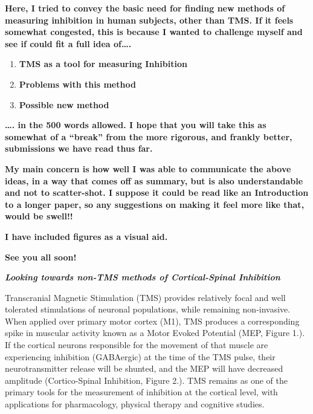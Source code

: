 \documentclass[]{article}
\date{}
\begin{document}
\textbf{Here, I tried to convey the basic need for finding new methods
of measuring inhibition in human subjects, other than TMS. If it feels
somewhat congested, this is because I wanted to challenge myself and see
if could fit a full idea of\ldots{}.}

\begin{enumerate}
\def\labelenumi{\arabic{enumi}.}
\item
  \textbf{TMS as a tool for measuring Inhibition}
\item
  \textbf{Problems with this method}
\item
  \textbf{Possible new method}
\end{enumerate}

\textbf{\ldots{}. in the 500 words allowed. I hope that you will take
this as somewhat of a ``break'' from the more rigorous, and frankly
better, submissions we have read thus far. }

\textbf{My main concern is how well I was able to communicate the above
ideas, in a way that comes off as summary, but is also understandable
and not to scatter-shot. I suppose it could be read like an Introduction
to a longer paper, so any suggestions on making it feel more like that,
would be swell!! }

\textbf{I have included figures as a visual aid. }

\textbf{See you all soon!}

\textbf{\emph{Looking towards non-TMS methods of Cortical-Spinal
Inhibition}}

Transcranial Magnetic Stimulation (TMS) provides relatively focal and
well tolerated stimulations of neuronal populations, while remaining
non-invasive. When applied over primary motor cortex (M1), TMS produces
a corresponding spike in muscular activity known as a Motor Evoked
Potential (MEP, Figure 1.). If the cortical neurons responsible for the
movement of that muscle are experiencing inhibition (GABAergic) at the
time of the TMS pulse, their neurotransmitter release will be shunted,
and the MEP will have decreased amplitude (Cortico-Spinal Inhibition,
Figure 2.). TMS remains as one of the primary tools for the measurement
of inhibition at the cortical level, with applications for pharmacology,
physical therapy and cognitive studies.
\end{document}
